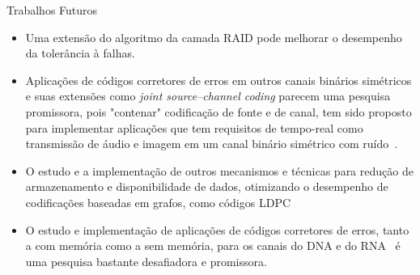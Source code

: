 \begin{frame}{Trabalhos Futuros}
   \begin{itemize}

        \item Uma extensão do algoritmo da camada RAID pode melhorar o desempenho da tolerância à falhas.

        \item Aplicações de códigos corretores de erros em outros canais binários simétricos e suas extensões como \emph{joint source–channel coding} parecem uma pesquisa promissora, pois "contenar" codificação de fonte e de canal, tem sido proposto para implementar aplicações que tem requisitos de tempo-real como transmissão de áudio e imagem em um canal binário simétrico com ruído~\cite{JSCC:2012}.

        \item O estudo e a implementação de outros mecanismos e técnicas para redução de armazenamento e disponibilidade de dados, otimizando o desempenho de codificações baseadas em grafos, como códigos LDPC

        \item O estudo e implementação de aplicações de códigos corretores de erros, tanto a com memória como a sem memória, para os canais do DNA e do RNA~\cite{Rocha:2010,Faria:2012} é uma pesquisa bastante desafiadora e promissora.

  \end{itemize}

\end{frame}
